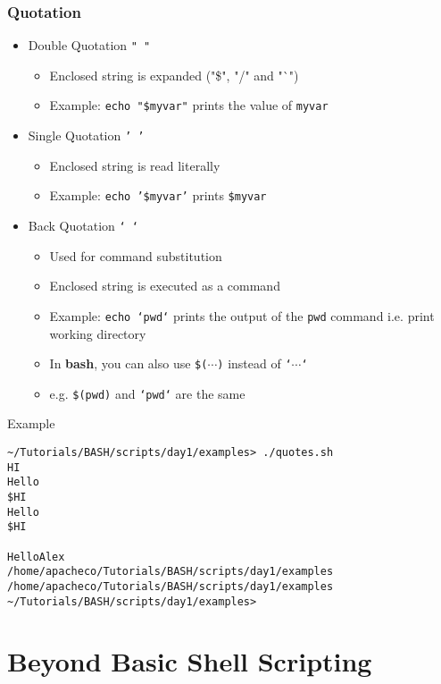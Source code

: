 \documentclass[10pt,t]{beamer}
\begin{document}
\begin{frame}
  \frametitle{Quotation}
  \begin{itemize}
    \item Double Quotation \texttt{" "}
    \begin{itemize}
        \item Enclosed string is expanded ("\$", "/" and "`")
        \item Example: \texttt{echo "\$myvar"} prints the value of \texttt{myvar}
    \end{itemize}
    \item Single Quotation \texttt{' '}
    \begin{itemize}
        \item Enclosed string is read literally
        \item Example: \texttt{echo '\$myvar'} prints \texttt{\$myvar}
    \end{itemize}
    \item Back Quotation \texttt{` `}
    \begin{itemize}
        \item Used for command substitution
        \item Enclosed string is executed as a command
        \item Example: \texttt{echo `pwd`} prints the output of the \texttt{pwd} command i.e. print working directory
        \item In \textbf{bash}, you can also use \texttt{\$($\cdots$)} instead of \texttt{`$\cdots$`}
        \item[] e.g. \texttt{\$(pwd)} and \texttt{`pwd`} are the same
    \end{itemize}
  \end{itemize}
\end{frame}

\begin{frame}[fragile]{Example}
  
  \begin{lstlisting}[basicstyle=\tiny\ttfamily,style=LINUX]
~/Tutorials/BASH/scripts/day1/examples> ./quotes.sh 
HI
Hello
$HI
Hello
$HI

HelloAlex
/home/apacheco/Tutorials/BASH/scripts/day1/examples
/home/apacheco/Tutorials/BASH/scripts/day1/examples
~/Tutorials/BASH/scripts/day1/examples>
  \end{lstlisting}
\end{frame}

\section{Beyond Basic Shell Scripting}
\end{document}
